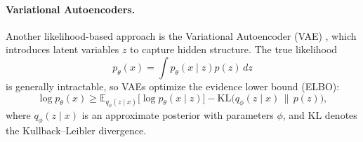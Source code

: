 \paragraph{Variational Autoencoders.}
Another likelihood-based approach is the Variational Autoencoder (VAE) \citep{kingma2013auto, pmlr-v32-rezende14}, which introduces latent variables $z$ to capture hidden structure. The true likelihood
\begin{equation}
p_\theta(x) = \int p_\theta(x \mid z) p(z) \, dz
\end{equation}
is generally intractable, so VAEs optimize the evidence lower bound (ELBO):
\begin{equation}
\log p_\theta(x) \geq \mathbb{E}_{q_\phi(z \mid x)} \big[ \log p_\theta(x \mid z) \big] - \mathrm{KL}\big(q_\phi(z \mid x) \,\|\, p(z)\big),
\end{equation}
where $q_\phi(z \mid x)$ is an approximate posterior with parameters $\phi$, and $\mathrm{KL}$ denotes the Kullback--Leibler divergence.